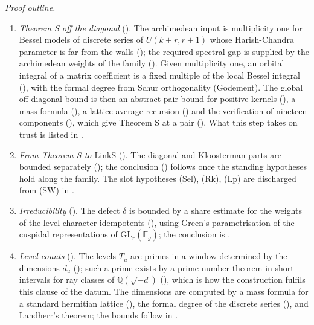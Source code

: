 \documentclass[10pt]{amsart}
\theoremstyle{definition}
\theoremstyle{remark}
\newcommand{\Q}{\mathbb Q}
\begin{document}
\emph{Proof outline.}
\begin{enumerate}
\item[(a)] \emph{Theorem S off the diagonal}
(\cite[\S\S\ref{A-i3:ssec-bessel}--\ref{A-i3:ssec-S}]{Annex}). The archimedean
input is multiplicity one for Bessel models of discrete series of
$U(k+r,r+1)$ whose Harish-Chandra parameter is far from the walls
(\cite[Proposition~\ref{A-i3:prop-bessel}]{Annex}); the required spectral gap
is supplied by the archimedean weights of the family
(\cite[\S\ref{A-i3:ssec-gap}]{Annex}). Given multiplicity one, an orbital
integral of a matrix coefficient is a fixed multiple of the local Bessel
integral (\cite[Proposition~\ref{A-i3:prop-amp}]{Annex}), with the formal
degree from Schur orthogonality (Godement). The global off-diagonal bound
is then an abstract pair bound for positive kernels
(\cite[Theorems~\ref{A-i3:S-thm-abstract} and~\ref{A-i3:S-thm-pairbound}]{Annex}),
a mass formula (\cite[Theorem~\ref{A-i3:S-thm-massformula}]{Annex}), a
lattice-average recursion (\cite[Theorem~\ref{A-i3:S-thm-recursion}]{Annex})
and the verification of nineteen components
(\cite[Theorem~\ref{A-i3:S-thm-components}]{Annex}), which give Theorem S at
a pair (\cite[Theorem~\ref{A-i3:S-thm-pair}]{Annex}). What this step takes
on trust is listed in \cite[Remark~\ref{A-i3:S-rem-trust}]{Annex}.
\item[(b)] \emph{From Theorem S to $\mathrm{LinkS}$}
(\cite[\S\ref{A-i3:ssec-linkS}]{Annex}). The diagonal and Kloosterman
parts are bounded separately (\cite[Propositions~\ref{A-i3:prop-kpp-off}
and~\ref{A-i3:prop-kpp-diag}]{Annex}); the conclusion
(\cite[Theorems~\ref{A-i3:thm-linkS-standing} and~\ref{A-i3:thm-linkS-slots}]{Annex})
follows once the standing hypotheses hold along the family. The slot
hypotheses (Sel), (Rk), (Lp) are discharged from (SW) in
\cite[Proposition~\ref{A-i3:prop-slots-SW}]{Annex}.
\item[(c)] \emph{Irreducibility} (\cite[\S\ref{A-i3:ssec-irr}]{Annex}). The
defect $\delta$ is bounded by a share estimate for the weights of the
level-character idempotents (\cite[Proposition~\ref{A-i3:prop-W}]{Annex}),
using Green's parametrisation of the cuspidal representations of
$\mathrm{GL}_r(\mathbb F_g)$; the conclusion is
\cite[Theorem~\ref{A-i3:thm-linkIRR}]{Annex}.
\item[(d)] \emph{Level counts} (\cite[\S\ref{A-i3:ssec-count}]{Annex}). The
levels $T_u$ are primes in a window determined by the dimensions $d_u$
(\cite[Lemma~\ref{A-i3:lem-power}]{Annex}); such a prime exists by a prime
number theorem in short intervals for ray classes of $\Q(\sqrt{-d})$
(\cite[Lemma~\ref{A-i3:lem-levelprime} and
Theorem~\ref{A-i3:thm-shortprimes}]{Annex}), which is how the construction
fulfils this clause of the datum. The dimensions are
computed by a mass formula for a standard hermitian lattice
(\cite[Proposition~\ref{A-i3:prop-massratio}]{Annex}), the formal degree of
the discrete series (\cite[Proposition~\ref{A-i3:thm-HC-fdeg}]{Annex}), and
Landherr's theorem; the bounds follow in
\cite[Propositions~\ref{A-i3:prop-V}, \ref{A-i3:prop-part5}
and~\ref{A-i3:prop-countF}]{Annex}.
\end{enumerate}
\end{document}
